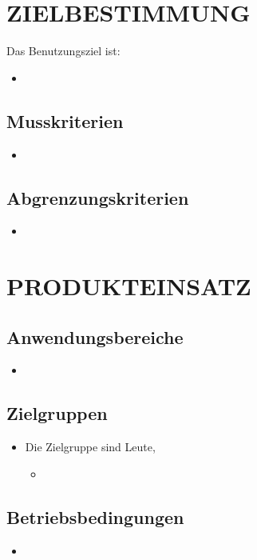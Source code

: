 \newpage
	\section{\Large ZIELBESTIMMUNG}
	Das Benutzungsziel ist:
	\begin{itemize}
		\item
	\end{itemize}
	\subsection{Musskriterien}
	\begin{itemize}
		\item
	\end{itemize}
	\subsection{Abgrenzungskriterien}
	\begin{itemize}
		\item
	\end{itemize}
	
	
	\section{\Large PRODUKTEINSATZ}
	\subsection{Anwendungsbereiche}
	\begin{itemize}
		\item
	\end{itemize}
	\subsection{Zielgruppen}
	\begin{itemize}
		\item Die Zielgruppe sind Leute, 
		\begin{itemize}
			\item
		\end{itemize}
	\end{itemize}
	\subsection{Betriebsbedingungen}
	\begin{itemize}
		\item
	\end{itemize}
	
